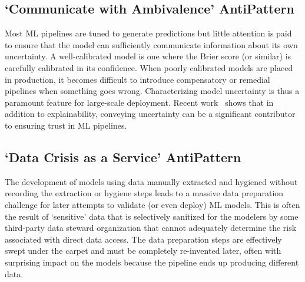 \subsection{`Communicate with Ambivalence' AntiPattern}\label{sec:calibration}
Most ML pipelines are
tuned to generate
predictions but little
attention is paid to ensure that the model can sufficiently communicate information about its own uncertainty. A well-calibrated model is one where the Brier score (or similar) is carefully calibrated in its confidence. 
When poorly calibrated models
are placed in production,
it becomes difficult to
introduce compensatory
or remedial pipelines when
something goes wrong. 
Characterizing
model uncertainty is thus
a paramount feature for
large-scale deployment.
Recent work~\cite{bhatt2020uncertainty} shows that
in addition to explainability, conveying uncertainty can be a significant contributor to ensuring trust in ML pipelines.

\subsection{`Data Crisis as a Service' 
AntiPattern}\label{sec:data_crisis_as_a_service}
The development of models using data manually extracted and hygiened without recording the extraction or hygiene steps leads to
a massive 
data preparation challenge
for
later attempts to validate (or even deploy) ML
models.
 This is often the result of `sensitive' data that is selectively sanitized for the modelers by some third-party data steward organization that cannot adequately determine the risk associated with direct data access. The data preparation steps are effectively swept under the carpet and must be completely re-invented later, often with surprising impact on the models because the pipeline ends up producing different data.

